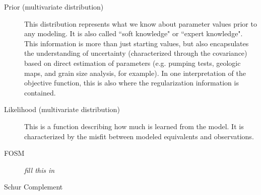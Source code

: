 \documentclass[english]{article}
\begin{document}
\begin{description}
\item [Prior (multivariate distribution)] This distribution represents what we know about parameter values prior to any modeling. It is also called ``soft knowledge" or ``expert knowledge". This information is more than just starting values, but also encapsulates the understanding of uncertainty (characterized through the covariance) based on direct estimation of parameters (e.g. pumping tests, geologic maps, and grain size analysis, for example). In one interpretation of the objective function, this is also where the regularization information is contained.
\item [Likelihood (multivariate distribution)]  This is a function describing how much is learned from the model. It is characterized by the misfit between modeled equivalents and observations.
\item [FOSM] \emph{fill this in}
\item [Schur Complement]
\end{description}
\end{document}

